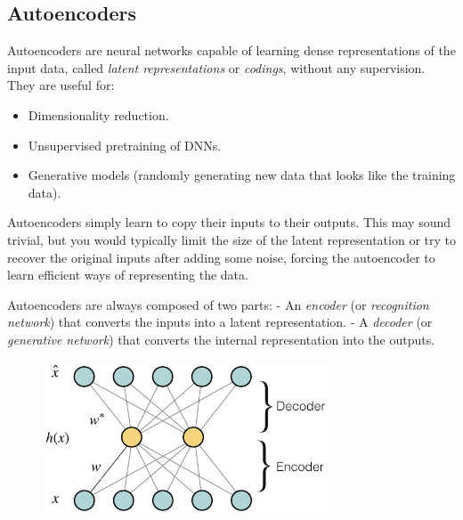 \vspace{+30.0mm}

\subsection{Autoencoders}

Autoencoders are neural networks capable of learning dense representations of the input data,
called \textit{latent representations} or \textit{codings}, without any supervision. They are useful for:
\vspace{-3.5mm}
\begin{itemize}
\item
Dimensionality reduction.
\item
\vspace{-2.0mm}
Unsupervised pretraining of DNNs.
\item
\vspace{-2.0mm}
Generative models (randomly generating new data that looks like the training data).
\end{itemize}

\vspace{-2.5mm}
Autoencoders simply learn to copy their inputs to their outputs.
This may sound trivial,
but you would typically limit the size of the latent representation
or try to recover the original inputs after adding some noise,
forcing the autoencoder to learn efficient ways of representing the data.

Autoencoders are always composed of two parts:\newline
- An \textit{encoder} (or \textit{recognition network}) that converts the inputs into a latent representation.\newline
- A \textit{decoder} (or \textit{generative network}) that converts the internal representation into the outputs.\newline

\begin{figure}[ht]
\centering
\includegraphics[width=0.75\textwidth]{./images/autoencoder.png}
\end{figure}

